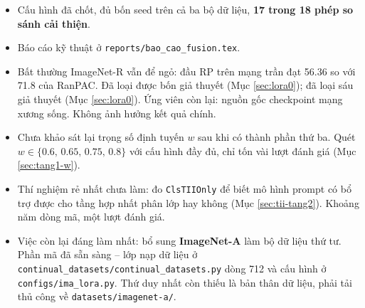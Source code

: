 \documentclass[11pt,a4paper]{article}
\begin{document}
\begin{itemize}
\item Cấu hình đã chốt, đủ bốn seed trên cả ba bộ dữ liệu, \textbf{17 trong 18
      phép so sánh cải thiện}.
\item Báo cáo kỹ thuật ở \texttt{reports/bao\_cao\_fusion.tex}.
\item Bất thường ImageNet-R vẫn để ngỏ: đầu RP trên mạng trần đạt 56.36
      so với 71.8 của RanPAC. Đã loại được bốn giả thuyết (Mục
      \ref{sec:lora0}); đã loại sáu giả thuyết (Mục
      \ref{sec:lora0}). Ứng viên còn lại: nguồn gốc checkpoint mạng xương
      sống. Không ảnh hưởng kết quả chính.
\item Chưa khảo sát lại trọng số định tuyến $w$ sau khi có thành phần
      thứ ba. Quét $w \in \{0.6,\, 0.65,\, 0.75,\, 0.8\}$ với cấu hình
      đầy đủ, chỉ tốn vài lượt đánh giá (Mục \ref{sec:tang1-w}).
\item Thí nghiệm rẻ nhất chưa làm: đo \texttt{ClsTIIOnly} để biết mô hình
      prompt có bổ trợ được cho tầng hợp nhất phân lớp hay không (Mục
      \ref{sec:tii-tang2}). Khoảng năm dòng mã, một lượt đánh giá.
\item Việc còn lại đáng làm nhất: bổ sung \textbf{ImageNet-A} làm bộ dữ liệu thứ
      tư. Phần mã đã sẵn sàng -- lớp nạp dữ liệu ở
      \texttt{continual\_datasets/continual\_datasets.py} dòng 712 và cấu hình ở
      \texttt{configs/ima\_lora.py}. Thứ duy nhất còn thiếu là bản thân dữ liệu,
      phải tải thủ công về \texttt{datasets/imagenet-a/}.
\end{itemize}
\end{document}

